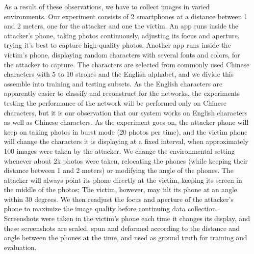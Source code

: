 As a result of these observations, we have to collect images in varied environments. Our experiment consists of 2 smartphones at a distance between 1 and 2 meters, one for the attacker and one the victim. An app runs inside the attacker's phone, taking photos continuously, adjusting its focus and aperture, trying it's best to capture high-quality photos. Another app runs inside the victim's phone, displaying random characters with several fonts and colors, for the attacker to capture. The characters are selected from commonly used Chinese characters with 5 to 10 strokes and the English alphabet, and we divide this assemble into training and testing subsets. As the English characters are apparently easier to classify and reconstruct for the networks, the experiments testing the performance of the network will be performed only on Chinese characters, but it is our observation that our system works on English characters as well as Chinese characters. As the experiment goes on, the attacker phone will keep on taking photos in burst mode (20 photos per time), and the victim phone will change the characters it is displaying at a fixed interval, when approximately 100 images were taken by the attacker. We change the environmental setting whenever about 2k photos were taken, relocating the phones (while keeping their distance between 1 and 2 meters) or modifying the angle of the phones. The attacker will always point its phone directly at the victim, keeping its screen in the middle of the photos; The victim, however, may tilt its phone at an angle within 30 degrees. We then readjust the focus and aperture of the attacker's phone to maximize the image quality before continuing data collection. Screenshots were taken in the victim's phone each time it changes its display, and these screenshots are scaled, spun and deformed according to the distance and angle between the phones at the time, and used as ground truth for training and evaluation.

